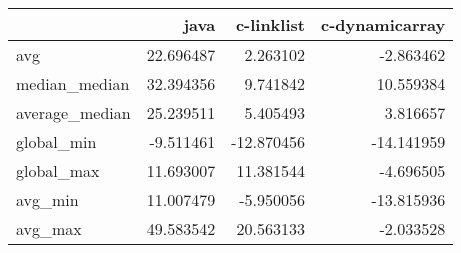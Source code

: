 \begin{tabular}{lrrr}
\toprule
{} &       java &  c-linklist &  c-dynamicarray \\
\midrule
avg            &  22.696487 &    2.263102 &       -2.863462 \\
median\_median  &  32.394356 &    9.741842 &       10.559384 \\
average\_median &  25.239511 &    5.405493 &        3.816657 \\
global\_min     &  -9.511461 &  -12.870456 &      -14.141959 \\
global\_max     &  11.693007 &   11.381544 &       -4.696505 \\
avg\_min        &  11.007479 &   -5.950056 &      -13.815936 \\
avg\_max        &  49.583542 &   20.563133 &       -2.033528 \\
\bottomrule
\end{tabular}
